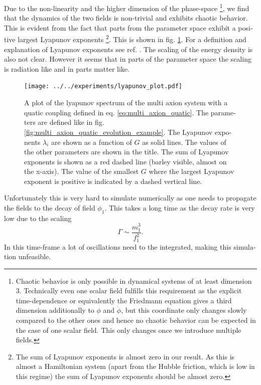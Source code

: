 \documentclass[master,       %
               twoside,        %
               BCOR10mm,       %
               english,ngerman, %
               ]{GAUBM}
\begin{document}
\begin{otherlanguage}{english}
Due to the non-linearity and the higher dimension of the phase-space \footnote{Chaotic behavior is only possible in dynamical systems of at least dimension $3$. Technically even one scalar field fulfills this requirement as the explicit time-dependence or equivalently the Friedmann equation gives a third dimension additionally to $\phi$ and $\dot{\phi}$, but this coordinate only changes slowly compared to the other ones and hence no chaotic behavior can be expected in the case of one scalar field. This only changes once we introduce multiple fields.}, we find that the dynamics of the two fields is non-trivial and exhibits chaotic behavior. This is evident from the fact that parts from the parameter space exhibit a positive largest Lyapunov exponents \footnote{The sum of Lyapunov exponents is almost zero in our result. As this is almost a Hamiltonian system (apart from the Hubble friction, which is low in this regime) the sum of Lyapunov exponents should be almost zero.}. This is shown in fig. \ref{fig:multi_axions_lyapunov}. For a definition and explanation of Lyapunov exponents see ref. \cite{nonlinear_dynamics}. The scaling of the energy density is also not clear. However it seems that in parts of the parameter space the scaling is radiation like and in parts matter like.
\begin{figure}[H]
	\texttt{[image: ../../experiments/lyapunov\_plot.pdf]}
	\caption{A plot of the lyapunov spectrum of the multi axion system with a quatic coupling defined in eq. \eqref{eq:multi_axion_quatic}. The parameters are defined like in fig. \ref{fig:multi_axion_quatic_evolution_example}. The Lyapunov exponents $\lambda_i$ are shown as a function of $G$ as solid lines. The values of the other parameters are shown in the title. The sum of Lyapunov exponents is shown as a red dashed line (barley visible, almost on the x-axis). The value of the smallest $G$ where the largest Lyapunov exponent is positive is indicated by a dashed vertical line.
	}
	\label{fig:multi_axions_lyapunov}
\end{figure}
Unfortunately this is very hard to simulate numerically as one needs to propagate the fields to the decay of field $\phi_1$. This takes a long time as the decay rate is very low due to the scaling
\begin{equation}
	\Gamma \sim \frac{m_1^3}{f_1^2}.
\end{equation}
In this time-frame a lot of oscillations need to the integrated, making this simulation unfeasible.


\end{otherlanguage}
\end{document}
